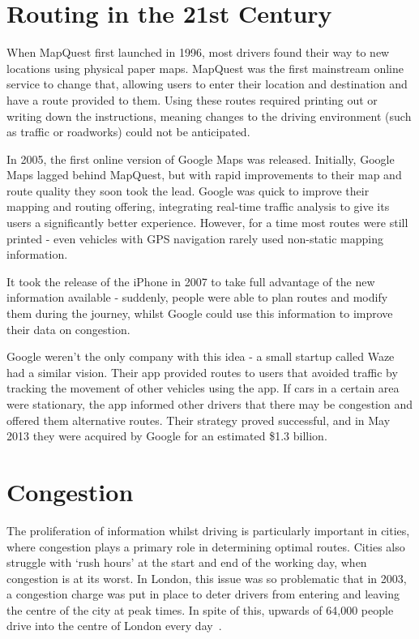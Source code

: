 \documentclass[ %
                    author={Alexander Hill},
                supervisor={Dr. Benjamin Sach},
                    degree={MEng},
                     title={MARMOSET},
                  subtitle={Multi-Agent Route Management using Online Simulation for Efficient Transportation},
                      type={research},
                      year={2016} ]{dissertation}
\begin{document}
\vspace{1cm}

\noindent

\section{Routing in the 21st Century}

When MapQuest first launched in 1996, most drivers found their way to new
locations using physical paper maps. MapQuest was the first mainstream online
service to change that, allowing users to enter their location and destination
and have a route provided to them. Using these routes required printing out or
writing down the instructions, meaning changes to the driving environment (such
as traffic or roadworks) could not be anticipated.

In 2005, the first online version of Google Maps was released. Initially, Google
Maps lagged behind MapQuest, but with rapid improvements to their map and route
quality they soon took the lead. Google was quick to improve their mapping and
routing offering, integrating real-time traffic analysis to give its users a
significantly better experience. However, for a time most routes were still
printed - even vehicles with GPS navigation rarely used non-static mapping
information.

It took the release of the iPhone in 2007 to take full advantage of the new
information available - suddenly, people were able to plan routes and modify
them during the journey, whilst Google could use this information to improve
their data on congestion.

Google weren't the only company with this idea - a small startup called Waze had
a similar vision. Their app provided routes to users that avoided traffic by
tracking the movement of other vehicles using the app. If cars in a
certain area were stationary, the app informed other drivers that there may be
congestion and offered them alternative routes. Their strategy proved
successful, and in May 2013 they were acquired by Google for an estimated \$1.3
billion.

\section{Congestion}

The proliferation of information whilst driving is particularly important in
cities, where congestion plays a primary role in determining optimal routes.
Cities also struggle with `rush hours' at the start and end of the working day,
when congestion is at its worst. In London, this issue was so problematic that
in 2003, a congestion charge was put in place to deter drivers from entering
and leaving the centre of the city at peak times. In spite of this, upwards of
64,000 people drive into the centre of London every day~\cite{tfl}.
\end{document}
